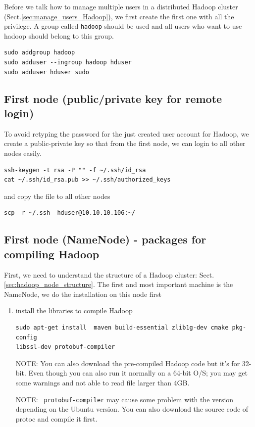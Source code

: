 Before we talk how to manage multiple users in a distributed Hadoop cluster
(Sect.\ref{sec:manage_users_Hadoop}), we first create the first one with all the
privilege. A group called \verb!hadoop! should be used and all users who want to
use hadoop should belong to this group. 
\begin{verbatim}
sudo addgroup hadoop
sudo adduser --ingroup hadoop hduser
sudo adduser hduser sudo
\end{verbatim}

\subsection{First node (public/private key for remote login)}

To avoid retyping the password for the just created user account for Hadoop, we
create a public-private key so that from the first node, we can login to all
other nodes easily.
\begin{verbatim}
ssh-keygen -t rsa -P "" -f ~/.ssh/id_rsa
cat ~/.ssh/id_rsa.pub >> ~/.ssh/authorized_keys
\end{verbatim}
and copy the file to all other nodes
\begin{verbatim}
scp -r ~/.ssh  hduser@10.10.10.106:~/
\end{verbatim}

\subsection{First node (NameNode) - packages for compiling Hadoop}

First, we need to understand the structure
of a Hadoop cluster: Sect.\ref{sec:hadoop_node_structure}. 
The first and most important machine is the NameNode, we do the installation on
this node first
\begin{enumerate}
  \item install the libraries to compile Hadoop
\begin{verbatim}
sudo apt-get install  maven build-essential zlib1g-dev cmake pkg-config
libssl-dev protobuf-compiler
\end{verbatim}

NOTE: You can also download the pre-compiled Hadoop code but it's for 32-bit.
Even though you can also run it normally on a 64-bit O/S; you may get some
warnings and not able to read file larger than 4GB.

NOTE: \verb! protobuf-compiler! may cause some problem with the version
depending on the Ubuntu version. You can also download the source code of
protoc and compile it first.
\end{enumerate}


